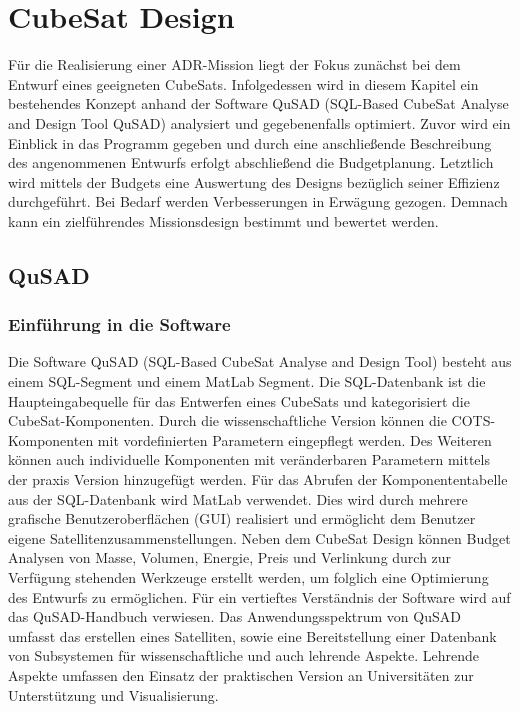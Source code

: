 \chapter{CubeSat Design}

	Für die Realisierung einer ADR-Mission liegt der Fokus zunächst bei dem Entwurf eines geeigneten CubeSats. Infolgedessen wird in diesem Kapitel ein bestehendes Konzept \cite{Lettau.} anhand der Software QuSAD (SQL-Based CubeSat Analyse and Design Tool QuSAD) analysiert und gegebenenfalls optimiert. Zuvor wird ein Einblick in das Programm gegeben und durch eine anschließende Beschreibung des angenommenen Entwurfs erfolgt abschließend die Budgetplanung. Letztlich wird mittels der Budgets eine Auswertung des Designs bezüglich seiner Effizienz durchgeführt. Bei Bedarf werden Verbesserungen in Erwägung gezogen. Demnach kann ein zielführendes Missionsdesign bestimmt und bewertet werden.
		
		\section{QuSAD}
			
			\subsection{Einführung in die Software}
			
	
	Die Software QuSAD (SQL-Based CubeSat Analyse and Design Tool) besteht aus einem SQL-Segment und einem MatLab Segment. Die SQL-Datenbank ist die Haupteingabequelle für das Entwerfen eines CubeSats und kategorisiert die CubeSat-Komponenten. Durch die wissenschaftliche Version können die COTS-Komponenten mit vordefinierten Parametern eingepflegt werden. Des Weiteren können auch individuelle Komponenten mit veränderbaren Parametern mittels der praxis Version hinzugefügt werden. Für das Abrufen der Komponententabelle aus der SQL-Datenbank wird MatLab verwendet. Dies wird durch mehrere grafische Benutzeroberflächen (GUI) realisiert und ermöglicht dem Benutzer eigene Satellitenzusammenstellungen. Neben dem CubeSat Design können Budget Analysen von Masse, Volumen, Energie, Preis und Verlinkung durch zur Verfügung stehenden Werkzeuge erstellt werden, um folglich eine Optimierung des Entwurfs zu ermöglichen. Für ein vertieftes Verständnis der Software wird auf das QuSAD-Handbuch \cite{Farahvashi.} verwiesen. Das Anwendungsspektrum von QuSAD umfasst das erstellen eines Satelliten, sowie eine Bereitstellung einer Datenbank von Subsystemen für wissenschaftliche und auch lehrende Aspekte. Lehrende Aspekte umfassen den Einsatz der praktischen Version an Universitäten zur Unterstützung und Visualisierung. \cite{Farahvashi.b}
			
